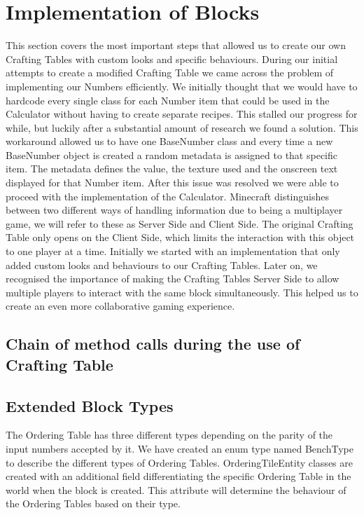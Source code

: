 \section{Implementation of Blocks}
This section covers the most important steps that allowed us to create our own Crafting Tables with custom looks and specific behaviours.\newline\newline
During our initial attempts to create a modified Crafting Table we came across the problem of implementing our Numbers efficiently. We initially thought that we would have to hardcode every single class for each Number item that could be used in the Calculator without having to create separate recipes. This stalled our progress for while, but luckily after a substantial amount of research we found a solution. This workaround allowed us to have one BaseNumber class and every time a new BaseNumber object is created a random metadata is assigned to that specific item. The metadata defines the value, the texture used and the onscreen text displayed for that Number item. After this issue was resolved we were able to proceed with the implementation of the Calculator.\newline\newline
Minecraft distinguishes between two different ways of handling information due to being a multiplayer game, we will refer to these as Server Side and Client Side. The original Crafting Table only opens on the Client Side, which limits the interaction with this object to one player at a time. Initially we started with an implementation that only added custom looks and behaviours to our Crafting Tables. Later on, we recognised the importance of making the Crafting Tables Server Side to allow multiple players to interact with the same block simultaneously. This helped us to create an even more collaborative gaming experience.

\subsection{Chain of method calls during the use of Crafting Table}

\subsection{Extended Block Types}
The Ordering Table has three different types depending on the parity of the input numbers accepted by it. We have created an enum type named BenchType to describe the different types of Ordering Tables. OrderingTileEntity classes are created with an additional field differentiating the specific Ordering Table in the world when the block is created. This attribute will determine the behaviour of the Ordering Tables based on their type.


